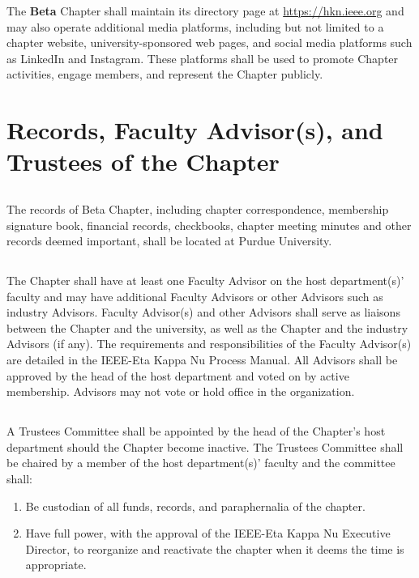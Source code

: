 \documentclass[10pt, oneside]{article}
\begin{document}
The \textbf{Beta} Chapter shall maintain its directory page at \url{https://hkn.ieee.org} and may also operate additional media platforms, including but not limited to a chapter website, university-sponsored web pages, and social media platforms such as LinkedIn and Instagram. These platforms shall be used to promote Chapter activities, engage members, and represent the Chapter publicly.

\section{Records, Faculty Advisor(s), and Trustees of the Chapter}
\subsection{}
The records of Beta Chapter, including chapter correspondence, membership signature book, financial records, checkbooks, chapter meeting minutes and other records deemed important, shall be located at Purdue University.
\subsection{}
The Chapter shall have at least one Faculty Advisor on the host department(s)’ faculty and may have additional Faculty Advisors or other Advisors such as industry Advisors.
Faculty Advisor(s) and other Advisors shall serve as liaisons between the Chapter and the university, as well as the Chapter and the industry Advisors (if any). The requirements and responsibilities of the Faculty Advisor(s) are detailed in the IEEE-Eta Kappa Nu Process Manual. All Advisors shall be approved by the head of the host department and voted on by active membership. Advisors may not vote or hold office in the organization.

\subsection{}
A Trustees Committee shall be appointed by the head of the Chapter’s host department should the Chapter become inactive. The Trustees Committee shall be chaired by a member of the host department(s)’ faculty and the committee shall:
\begin{enumerate}[label=\alph*.]
\item Be custodian of all funds, records, and paraphernalia of the chapter.
\item Have full power, with the approval of the IEEE-Eta Kappa Nu Executive
Director, to reorganize and reactivate the chapter when it deems the time is appropriate.
\end{enumerate}
\end{document}
